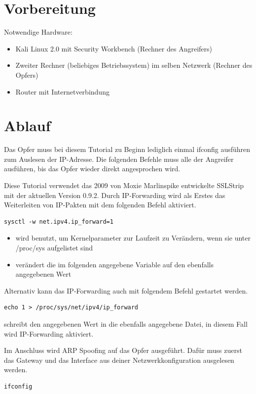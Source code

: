 \section{Vorbereitung}
Notwendige Hardware:

\begin{itemize}
	\item Kali Linux 2.0 mit Security Workbench (Rechner des Angreifers)
	\item Zweiter Rechner (beliebiges Betriebssystem) im selben Netzwerk (Rechner des Opfers)
	\item Router mit Internetverbindung
\end{itemize}

\section{Ablauf}
Das Opfer muss bei diesem Tutorial zu Beginn lediglich einmal ifconfig ausführen zum Auslesen der IP-Adresse. Die folgenden Befehle muss alle der Angreifer ausführen, bis das Opfer wieder direkt angesprochen wird.

Diese Tutorial verwendet das 2009 von Moxie Marlinspike entwickelte SSLStrip mit der aktuellen Version 0.9.2. Durch IP-Forwarding wird als Erstes das Weiterleiten von IP-Pakten mit dem folgenden Befehl aktiviert.

\begin{lstlisting}
sysctl -w net.ipv4.ip_forward=1
\end{lstlisting}

\begin{itemize}
	\item {} wird benutzt, um Kernelparameter zur Laufzeit zu Verändern, wenn sie unter /proc/sys aufgelistet sind
	\item {} verändert die im folgenden angegebene Variable auf den ebenfalls angegebenen Wert
\end{itemize}

Alternativ kann das IP-Forwarding auch mit folgendem Befehl gestartet werden.

\begin{lstlisting}
echo 1 > /proc/sys/net/ipv4/ip_forward
\end{lstlisting}

 schreibt den angegebenen Wert in die ebenfalls angegebene Datei, in diesem Fall wird IP-Forwarding aktiviert.

Im Anschluss wird ARP Spoofing auf das Opfer ausgeführt. Dafür muss zuerst das Gateway und das Interface aus deiner Netzwerkkonfiguration ausgelesen werden. 
\begin{lstlisting}
ifconfig
\end{lstlisting}

